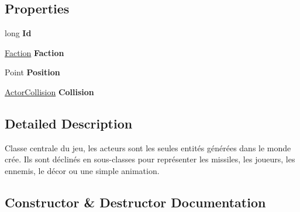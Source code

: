 \subsection*{Properties}
\begin{DoxyCompactItemize}
\item 
\mbox{\label{class_tentacle_slicers_1_1actors_1_1_actor_a8ac01513637a53735f313b67734542ca}} 
long {\bfseries Id}
\item 
\mbox{\label{class_tentacle_slicers_1_1actors_1_1_actor_aa293b5d0dd20935fc7313dd6f60c3819}} 
\hyperlink{namespace_tentacle_slicers_1_1actors_aaae1293c828d51288c24ab9156ff5475}{Faction} {\bfseries Faction}
\item 
\mbox{\label{class_tentacle_slicers_1_1actors_1_1_actor_a42db450bc7938adb83bc674642335850}} 
Point {\bfseries Position}
\item 
\mbox{\label{class_tentacle_slicers_1_1actors_1_1_actor_a7c41b33fbb33abdb7eb652ab61b690ef}} 
\hyperlink{class_tentacle_slicers_1_1collisions_1_1_actor_collision}{Actor\+Collision} {\bfseries Collision}
\end{DoxyCompactItemize}


\subsection{Detailed Description}
Classe centrale du jeu, les acteurs sont les seules entités générées dans le monde crée. Ils sont déclinés en sous-\/classes pour représenter les missiles, les joueurs, les ennemis, le décor ou une simple animation. 



\subsection{Constructor \& Destructor Documentation}
\mbox{\label{class_tentacle_slicers_1_1actors_1_1_actor_ab544a07f9d12750f9896e4a604b699f1}} 
